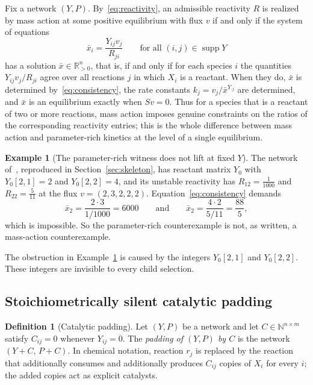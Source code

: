 \documentclass[11pt,a4paper]{article}
\theoremstyle{plain}
\theoremstyle{definition}
\newtheorem{definition}[theorem]{Definition}
\newtheorem{example}[theorem]{Example}
\theoremstyle{remark}
\newcommand{\R}{\mathbb{R}}
\newcommand{\N}{\mathbb{N}}
\newcommand{\supp}{\operatorname{supp}}
\newcommand{\xbar}{\bar{x}}
\begin{document}
Fix a network $(Y,P)$. By~\eqref{eq:reactivity}, an admissible reactivity $R$ is realized by mass action at some positive equilibrium with flux $v$ if and only if the system of equations
\begin{equation}\label{eq:consistency}
  \xbar_i=\frac{Y_{ij}v_j}{R_{ji}}\qquad\text{for all }(i,j)\in\supp Y
\end{equation}
has a solution $\xbar\in\R_{>0}^n$, that is, if and only if for each species $i$ the quantities $Y_{ij}v_j/R_{ji}$ agree over all reactions $j$ in which $X_i$ is a reactant. When they do, $\xbar$ is determined by~\eqref{eq:consistency}, the rate constants $k_j=v_j/\xbar^{Y_{\cdot j}}$ are determined, and $\xbar$ is an equilibrium exactly when $Sv=0$. Thus for a species that is a reactant of two or more reactions, mass action imposes genuine constraints on the ratios of the corresponding reactivity entries; this is the whole difference between mass action and parameter-rich kinetics at the level of a single equilibrium.

\begin{example}[The parameter-rich witness does not lift at fixed $Y$]\label{ex:obstruction}
The network of~\cite{Companion2026}, reproduced in Section~\ref{sec:skeleton}, has reactant matrix $Y_0$ with $Y_0[2,1]=2$ and $Y_0[2,2]=4$, and its unstable reactivity has $R_{12}=\frac1{1000}$ and $R_{22}=\frac5{11}$ at the flux $v=(2,3,2,2,2)$. Equation~\eqref{eq:consistency} demands
\[
  \xbar_2=\frac{2\cdot 3}{1/1000}=6000\qquad\text{and}\qquad \xbar_2=\frac{4\cdot 2}{5/11}=\frac{88}{5},
\]
which is impossible. So the parameter-rich counterexample is not, as written, a mass-action counterexample.
\end{example}

The obstruction in Example~\ref{ex:obstruction} is caused by the integers $Y_0[2,1]$ and $Y_0[2,2]$. These integers are invisible to every child selection.

\subsection{Stoichiometrically silent catalytic padding}

\begin{definition}[Catalytic padding]
Let $(Y,P)$ be a network and let $C\in\N^{n\times m}$ satisfy $C_{ij}=0$ whenever $Y_{ij}=0$. The \emph{padding of $(Y,P)$ by $C$} is the network $(Y+C,\,P+C)$. In chemical notation, reaction $r_j$ is replaced by the reaction that additionally consumes and additionally produces $C_{ij}$ copies of $X_i$ for every $i$; the added copies act as explicit catalysts.
\end{definition}
\end{document}
